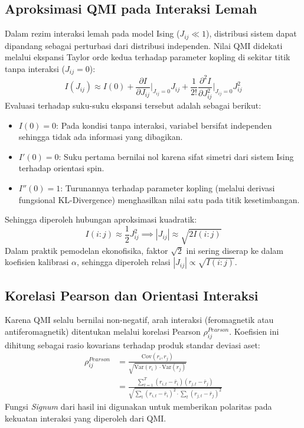 \subsection{Aproksimasi QMI pada Interaksi Lemah}
Dalam rezim interaksi lemah pada model Ising ($J_{ij} \ll 1$), distribusi sistem dapat dipandang sebagai perturbasi dari distribusi independen. Nilai QMI didekati melalui ekspansi Taylor orde kedua terhadap parameter kopling di sekitar titik tanpa interaksi ($J_{ij} = 0$):
\begin{equation}
I(J_{ij}) \approx I(0) + \frac{\partial I}{\partial J_{ij}} \bigg|_{J_{ij}=0} J_{ij} + \frac{1}{2!} \frac{\partial^2 I}{\partial J_{ij}^2} \bigg|_{J_{ij}=0} J_{ij}^2
\end{equation}
Evaluasi terhadap suku-suku ekspansi tersebut adalah sebagai berikut:
\begin{itemize}
    \item $I(0) = 0$: Pada kondisi tanpa interaksi, variabel bersifat independen sehingga tidak ada informasi yang dibagikan.
    \item $I'(0) = 0$: Suku pertama bernilai nol karena sifat simetri dari sistem Ising terhadap orientasi spin.
    \item $I''(0) = 1$: Turunannya terhadap parameter kopling (melalui derivasi fungsional KL-Divergence) menghasilkan nilai satu pada titik kesetimbangan.
\end{itemize}
Sehingga diperoleh hubungan aproksimasi kuadratik:
\begin{equation}
I(i:j) \approx \frac{1}{2} J_{ij}^2 \implies |J_{ij}| \approx \sqrt{2 I(i:j)}
\end{equation}
Dalam praktik pemodelan ekonofisika, faktor $\sqrt{2}$ ini sering diserap ke dalam koefisien kalibrasi $\alpha$, sehingga diperoleh relasi $|J_{ij}| \propto \sqrt{I(i:j)}$.

\subsection{Korelasi Pearson dan Orientasi Interaksi}
Karena QMI selalu bernilai non-negatif, arah interaksi (feromagnetik atau antiferomagnetik) ditentukan melalui korelasi Pearson $\rho_{ij}^{Pearson}$. Koefisien ini dihitung sebagai rasio kovarians terhadap produk standar deviasi aset:
\begin{equation}
\begin{aligned}
\rho_{ij}^{Pearson} &= \frac{\text{Cov}(r_i, r_j)}{\sqrt{\text{Var}(r_i) \cdot \text{Var}(r_j)}} \\
&= \frac{\sum_{t=1}^{T}(r_{i,t} - \bar{r}_i)(r_{j,t} - \bar{r}_j)}{\sqrt{\sum_t(r_{i,t}-\bar{r}_i)^2 \cdot \sum_t(r_{j,t}-\bar{r}_j)^2}}
\end{aligned}
\label{eq:pearson_derivation_appendix}
\end{equation}
Fungsi \textit{Signum} dari hasil ini digunakan untuk memberikan polaritas pada kekuatan interaksi yang diperoleh dari QMI.

